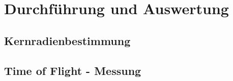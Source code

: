 \section{Durchführung und Auswertung}

\subsection{Kernradienbestimmung}



\subsection{Time of Flight - Messung}

